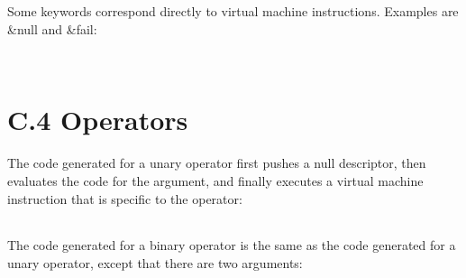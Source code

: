Some keywords correspond directly to virtual machine
instructions. Examples are \&null and \&fail:

\begin{flushleft}
\tablelasttail{\hline}
\begin{supertabular}{|m{1.9066598in}|m{2.75596in}|}

\end{supertabular}
\end{flushleft}

\bigskip

\begin{flushleft}
\tablelasttail{\hline}
\begin{supertabular}{|m{1.9066598in}|m{2.75596in}|}

\end{supertabular}
\end{flushleft}


\section[C.4 Operators]{C.4 Operators}

The code generated for a unary operator first pushes a null
descriptor, then evaluates the code for the argument, and finally
executes a virtual machine instruction that is specific to the
operator:

\begin{flushleft}
\tablelasttail{\hline}
\begin{supertabular}{|m{1.9066598in}|m{2.75596in}|}

\end{supertabular}
\end{flushleft}

The code generated for a binary operator is the same as the code
generated for a unary operator, except that there are two arguments:

\begin{flushleft}
\tablelasttail{\hline}
\begin{supertabular}{|m{1.9066598in}|m{2.75596in}|}

\end{supertabular}
\end{flushleft}

